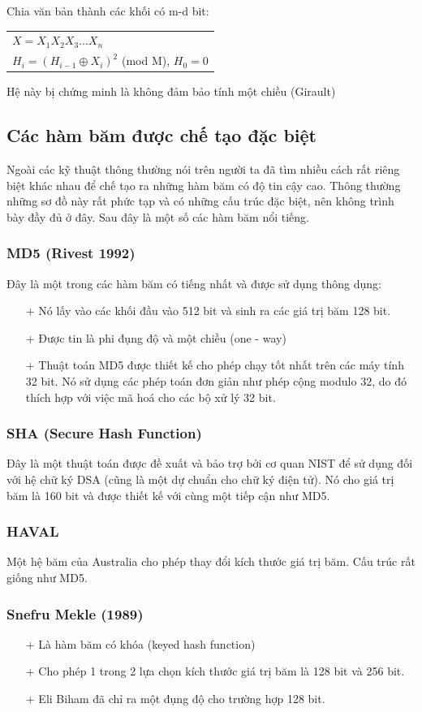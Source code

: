 \documentclass[a4paper,12pt]{report}
\begin{document}
Chia văn bản thành các khối có m-d bit:
\begin{center}
\begin{tabular}{l}
$X = X_1 X_2 X_3 \ldots X_n$ \\
$H_i = (H_{i-1} \oplus X_i)^2$ (mod M), $H_0 = 0$
\end{tabular}
\end{center}

Hệ này bị chứng minh là không đảm bảo tính một chiều (Girault)

\subsection*{Các hàm băm được chế tạo đặc biệt}
Ngoài các kỹ thuật thông thường nói trên người ta đã tìm nhiều cách rất riêng biệt khác nhau để chế tạo ra những hàm băm có độ tin cậy cao. Thông thường những sơ đồ này rất phức tạp và có những cấu trúc đặc biệt, nên không trình bày đầy đủ ở đây. Sau đây là một số các hàm băm nổi tiếng.
\subsubsection{MD5  (Rivest 1992)}
Đây là một trong các hàm băm có tiếng nhất và được sử dụng thông dụng:
\begin{itemize}
\item[+] Nó lấy vào các khối đầu vào 512 bit và sinh ra các giá trị băm 128 bit.
\item[+] Được tin là phi đụng độ và một chiều (one - way)
\item[+] Thuật toán MD5 được thiết kế cho phép chạy tốt nhất trên các máy tính 32 bit. Nó sử dụng các phép toán đơn giản như phép cộng modulo 32, do đó thích hợp với việc mã hoá cho các bộ xử lý 32 bit.
\end{itemize}
\subsubsection{SHA (Secure Hash Function)}
Đây là một thuật toán được đề xuất và bảo trợ bởi cơ quan NIST để sử dụng đối với hệ chữ ký DSA (cũng là một dự chuẩn cho chữ ký điện tử). Nó cho giá trị băm là 160 bit và được thiết kế với cùng một tiếp cận như MD5.
\subsubsection{HAVAL}
Một hệ băm của Australia cho phép thay đổi kích thước giá trị băm. Cấu trúc rất giống như MD5.
\subsubsection{Snefru Mekle (1989)}
\begin{itemize}
\item[+] Là hàm băm có khóa (keyed hash function)
\item[+] Cho phép 1 trong 2 lựa chọn kích thước giá trị băm là 128 bit và 256 bit.
\item[+] Eli Biham đã chỉ ra một đụng độ cho trường hợp 128 bit.
\end{itemize}
\end{document}
